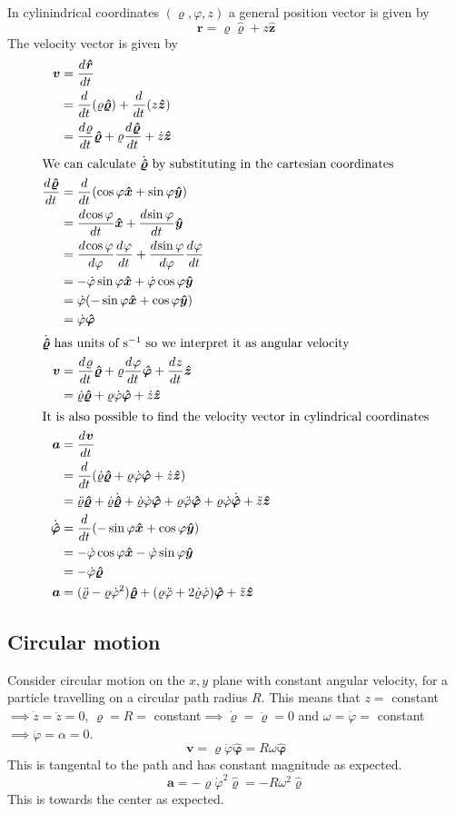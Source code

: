 \documentclass{article}
\newcommand{\vh}[1]{\vec{\hat{#1}}}
\renewcommand{\vec}[1]{\bm{#1}}
\newcommand{\vv}[1]{\vec{#1}}
\newcommand{\dv}[3][]{\frac{d^{#1}{#2}}{d{#3}^{#1}}}
\newcommand{\diff}[2][]{\frac{d^{#1}}{d{#2}^{#1}}}
\begin{document}
In cylinindrical coordinates \((\varrho,\varphi,z)\) a general position vector is given by
\[\vv r = \varrho\vh\varrho+z\vh z\]
The velocity vector is given by
\begin{align*}
\vv v&=\dv{\vh r}{t}\\
&=\diff t(\varrho\vh\varrho)+\diff t(z\vh z)\\
&=\dv{\varrho}{t}\vh\varrho+\varrho\dv{\vh\varrho}{t}+\dot z\vh z\\
\intertext{We can calculate \(\dot{\vh\varrho}\) by substituting in the cartesian coordinates}
\dv{\vh\varrho}{t}&=\diff t(\cos\varphi\vh x+\sin\varphi\vh y)\\
&=\dv{\cos\varphi}{t}\vh x+\dv{\sin\varphi}{t}\vh y\\
&=\dv{\cos\varphi}{\varphi}\dv{\varphi}{t}+\dv{\sin\varphi}{\varphi}\dv{\varphi}{t}\\
&=-\dot\varphi\sin\varphi\vh x+\dot\varphi\cos\varphi\vh y\\
&=\dot\varphi(-\sin\varphi\vh x+\cos\varphi\vh y)\\
&=\dot\varphi\vh\varphi\\
\intertext{\(\dot{\vh\varrho}\) has units of \si{s^{-1}} so we interpret it as angular velocity}
\vv v&=\dv{\varrho}{t}\vh\varrho+\varrho\dv{\varphi}{t}\vh\varphi+\dv{z}{t}\vh z\\
&=\dot\varrho\vh\varrho+\varrho\dot\varphi\vh\varphi+\dot z\vh z\\
\intertext{It is also possible to find the velocity vector in cylindrical coordinates}
\vv a&=\dv{\vv v}{t}\\
&=\diff t(\dot\varrho\vh\varrho+\varrho\dot\varphi\vh\varphi+\dot z\vh z)\\
&=\ddot\varrho\vh\varrho+\dot\varrho\dot{\vh\varrho}+\dot\varrho\dot\varphi\vh\varphi+\varrho\ddot\varphi\vh\varphi+\varrho\dot\varphi\dot{\vh\varphi}+\ddot z\vh z\\
\dot{\vh\varphi}&=\diff t(-\sin\varphi\vh x+\cos\varphi\vh y)\\
&=-\dot\varphi\cos\varphi\vh x-\dot\varphi\sin\varphi\vh y\\
&=-\dot\varphi\vh\varrho\\
\vv a&=(\ddot\varrho-\varrho\dot\varphi^2)\vh\varrho+(\varrho\ddot\varphi+2\dot\varrho\dot\varphi)\vh\varphi+\ddot z\vh z
\end{align*}

\subsection*{Circular motion}
Consider circular motion on the \(x,y\) plane with constant angular velocity, for a particle travelling on a circular path radius \(R\). This means that \(z=\) constant\(\implies\dot z=\ddot z=0\), \(\varrho=R=\) constant\(\implies\dot\varrho=\ddot\varrho=0\) and \(\omega=\dot\varphi=\) constant\(\implies\ddot\varphi=\alpha=0\).
\[\vv v=\varrho\dot\varphi\vh\varphi=R\omega\vh\varphi\]
This is tangental to the path and has constant magnitude as expected.
\[\vv a=-\varrho\dot\varphi^2\vh\varrho=-R\omega^2\vh\varrho\]
This is towards the center as expected.
\end{document}
